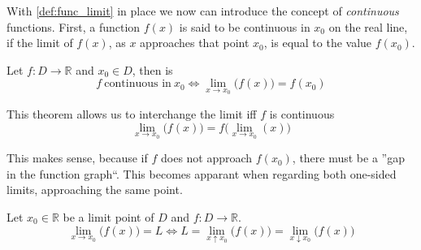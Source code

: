 With \cref{def:func_limit} in place we now can introduce the concept of \emph{continuous} functions.
First, a function \(f(x)\) is said to be continuous in \(x_0\) on the real line, if the limit of \(f(x)\), as \(x\) approaches that point \(x_0\), is equal to the value \(f(x_0)\).
\begin{theorem}
   Let \(f: D \to \mathbb{R}\) and \(x_0 \in D\), then is
   \[f~\text{continuous in}~x_0 \iff \lim_{x \to x_0}\big(f(x)\big) = f(x_0)\]
\end{theorem}
\begin{remark}[Intuition]
   This theorem allows us to interchange the limit iff \(f\) is continuous
   \[\lim_{x \to x_0}\big(f(x)\big) = f\big(\lim_{x \to x_0}(x)\big)\]
\end{remark}
This makes sense, because if \(f\) does not approach \(f(x_0)\), there must be a ''gap in the function graph``.
This becomes apparant when regarding both one-sided limits, approaching the same point.
\begin{theorem}
   Let \(x_0 \in \mathbb{R}\) be a limit point of \(D\) and \(f: D \to \mathbb{R}\).
   \[\lim_{x \to x_0}\big(f(x)\big) = L \iff L = \lim_{x \uparrow x_0}\big(f(x)\big) = \lim_{x \downarrow x_0}\big(f(x)\big)\]
\end{theorem}

